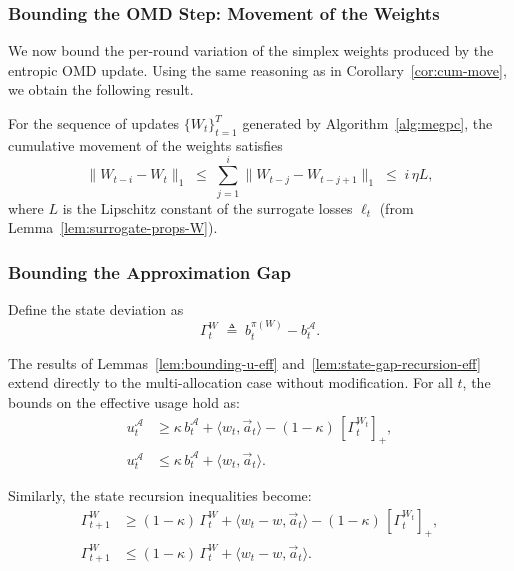 \subsubsection{Bounding the OMD Step: Movement of the Weights}

We now bound the per-round variation of the simplex weights produced by the entropic OMD update.  
Using the same reasoning as in Corollary~\ref{cor:cum-move}, we obtain the following result.

\begin{Thm:Corollary}\label{cor:cum-move-W}
For the sequence of updates \(\{W_t\}_{t=1}^T\) generated by Algorithm~\ref{alg:megpc},  
the cumulative movement of the weights satisfies
\[
\|W_{t-i} - W_t\|_1
\;\le\;
\sum_{j=1}^i \|W_{t-j} - W_{t-j+1}\|_1
\;\le\;
i\,\eta L,
\]
where \(L\) is the Lipschitz constant of the surrogate losses \(\ell_t\) (from Lemma~\ref{lem:surrogate-props-W}).  
\end{Thm:Corollary}

\subsubsection{Bounding the Approximation Gap}

Define the state deviation as
\[
\Gamma_t^{W} \;\triangleq\; b_t^{\pi(W)} - b_t^{\mathcal{A}}.
\]

\begin{Thm:Remark}
The results of Lemmas~\ref{lem:bounding-u-eff} and~\ref{lem:state-gap-recursion-eff} extend directly to the multi-allocation case without modification.  
For all \(t\), the bounds on the effective usage hold as:
\begin{align}
\label{eq:u-lower-bound-eff-W}
u_t^{\mathcal{A}}
&\ge
\kappa\, b_t^{\mathcal{A}} + \langle w_t, \vec{a}_t \rangle
- (1-\kappa)\,[\Gamma_t^{W_t}]_+, \\[4pt]
\label{eq:u-upper-bound-eff-W}
u_t^{\mathcal{A}}
&\le
\kappa\, b_t^{\mathcal{A}} + \langle w_t, \vec{a}_t \rangle.
\end{align}

Similarly, the state recursion inequalities become:
\begin{align}
\label{eq:GAMMA-Lower-W}
\Gamma_{t+1}^{W}
&\ge
(1-\kappa)\,\Gamma_t^{W}
+ \langle w_t - w, \vec{a}_t \rangle
- (1-\kappa)\,[\Gamma_t^{W_t}]_+, \\[4pt]
\label{eq:GAMMA-Upper-W}
\Gamma_{t+1}^{W}
&\le
(1-\kappa)\,\Gamma_t^{W}
+ \langle w_t - w, \vec{a}_t \rangle.
\end{align}

\end{Thm:Remark}







